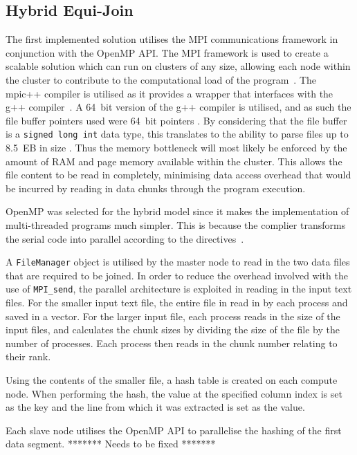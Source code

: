 \documentclass[12pt,twocolumn]{witseiepaper}
\begin{document}
\subsection{Hybrid Equi-Join}
The first implemented solution utilises the MPI communications framework in conjunction with the OpenMP API. The MPI framework is used to create a scalable solution which can run on clusters of any size, allowing each node within the cluster to contribute to the computational load of the program~\cite{mpi-scale}. The mpic++ compiler is utilised as it provides a wrapper that interfaces with the g++ compiler~\cite{mpic++-wrapper}. A 64~bit version of the g++ compiler is utilised, and as such the file buffer pointers used were 64~bit pointers \cite{pointer-size}. By considering that the file buffer is a \texttt{signed long int} data type, this translates to the ability to parse files up to 8.5~EB in size \cite{pointer-size}. Thus the memory bottleneck will most likely be enforced by the amount of RAM and page memory available within the cluster. This allows the file content to be read in completely, minimising data access overhead that would be incurred by reading in data chunks through the program execution.

OpenMP was selected for the hybrid model since it makes the implementation of multi-threaded programs much simpler. This is because the complier transforms the serial code into parallel according to the directives~\cite{comparingMPIMapReduce}.

A \texttt{FileManager} object is utilised by the master node to read in the two data files that are required to be joined. In order to reduce the overhead involved with the use of \texttt{MPI\_send}, the parallel architecture is exploited in reading in the input text files. For the smaller input text file, the entire file in read in by each process and saved in a vector. For the larger input file, each process reads in the size of the input files, and calculates the chunk sizes by dividing the size of the file by the number of processes. Each process then reads in the chunk number relating to their rank.

Using the contents of the smaller file, a hash table is created on each compute node. When performing the hash, the value at the specified column index is set as the key and the line from which it was extracted is set as the value.

Each slave node utilises the OpenMP API to parallelise the hashing of the first data segment. ******* Needs to be fixed *******
\end{document}
